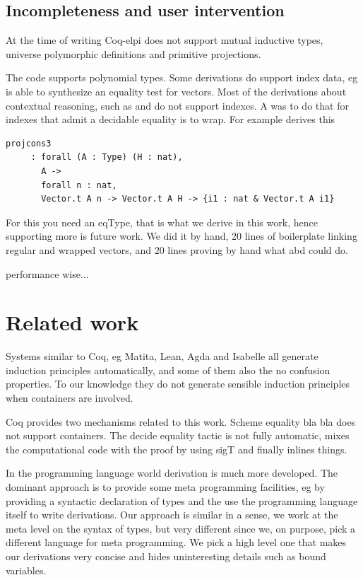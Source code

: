 \documentclass[sigplan,10pt,review]{acmart}\settopmatter{printfolios=true,printccs=false,printacmref=false}
\newcommand{\derive}[1]{\keys{#1}}
\begin{document}
\subsection{Incompleteness and user intervention} %
\label{sec:oops}

At the time of writing Coq-elpi does not support mutual inductive
types, universe polymorphic definitions and primitive projections.

The code supports polynomial types. Some derivations do
support index data, eg \derive{eq} is able to synthesize
an equality test for vectors. Most of the derivations about
contextual reasoning, such as \derive{eqK} and \derive{bcongr}
do not support indexes. A was to do that for indexes that admit a
decidable equality is to wrap. For example \derive{projK} derives
this

\begin{lstlisting}
projcons3
     : forall (A : Type) (H : nat),
       A ->
       forall n : nat,
       Vector.t A n -> Vector.t A H -> {i1 : nat & Vector.t A i1}
\end{lstlisting}

For this you need an eqType, that is what we derive in this work,
hence supporting more is future work. We did it by hand, 20 lines of
boilerplate linking regular and wrapped vectors, and 20 lines proving
by hand what \derive{eqK} abd \derive{bcongr} could do.

performance wise...

\section{Related work} %
\label{sec:related}

Systems similar to Coq, eg Matita, Lean, Agda and Isabelle all generate
induction principles automatically, and some of them also the
no confusion properties. To our knowledge they do not generate
sensible induction principles when containers are involved.

Coq provides two mechanisms related to this work.
Scheme equality bla bla does not support containers.
The decide equality tactic is not fully automatic,
mixes the computational code with the proof by using sigT
and finally inlines things.

In the programming language world derivation is much more developed.
The dominant approach is to provide some meta programming facilities,
eg by providing a syntactic declaration of types and the use the
programming language itself to write derivations. Our approach
is similar in a sense, we work at the meta level on the syntax of
types, but very different since we, on purpose, pick a different
language for meta programming. We pick a high level one that makes
our derivations very concise and hides uninteresting details such
as bound variables.
\end{document}
